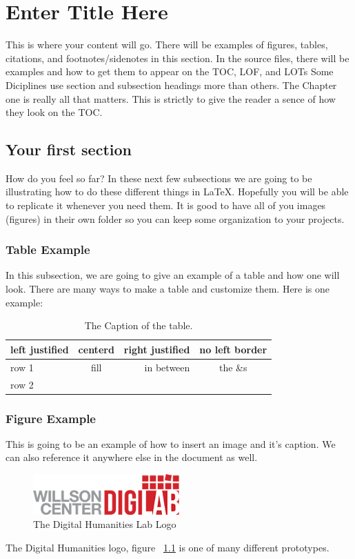 \documentclass[./dissertation.tex]{subfiles}
\begin{document}
    \chapter{Enter Title Here}
    This is where your content will go. There will be examples of figures, tables, citations, and footnotes/sidenotes in this section. In the source files, there will be examples and how to get them to appear on the TOC, LOF, and LOTs Some Diciplines use section and subsection headings more than others. The Chapter one is really all that matters. This is strictly to give the reader a sence of how they look on the TOC.
    \section{Your first section}
      How do you feel so far? In these next few subsections we are going to be illustrating how to do these different things in LaTeX. Hopefully you will be able to replicate it whenever you need them.
      It is good to have all of you images (figures) in their own folder so you can keep some organization to your projects.

      \subsection{Table Example}
        In this subsection, we are going to give an example of a table and how one will look. There are many ways to make a table and customize them. Here is one example:


      \begin{table}[ht]
        \centering
      \begin{tabular}[c]{|l|c|rc|}
        \hline
        left justified  & centerd  & right justified  & no left border\\
        \hline
        row 1 & fill & in between & the \&s\\
        row 2 & & &\\
        \hline

      \end{tabular}
      \caption{The Caption of the table.}
      \label{table:someTable}
      \end{table}



      \subsection{Figure Example}
      This is going to be an example of how to insert an image and it's caption. We can also reference it anywhere else in the document as well.
      \begin{figure}[h]
        \centering\includegraphics[width=0.5\textwidth]{figures/digilab_logo}
        \caption{The Digital Humanities Lab Logo}
        \label{fig:digilogo}
      \end{figure}
      The Digital Humanities logo, figure ~\ref{fig:digilogo} is one of many different prototypes.
\end{document}

